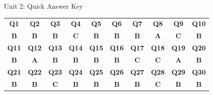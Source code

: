 \begin{answerkeytable}{Unit 2: Quick Answer Key}
\begin{tabular}{c c c c c c c c c c}
\toprule
\textbf{Q1} & \textbf{Q2} & \textbf{Q3} & \textbf{Q4} & \textbf{Q5} & \textbf{Q6} & \textbf{Q7} & \textbf{Q8} & \textbf{Q9} & \textbf{Q10} \\
\textbf{B} & \textbf{B} & \textbf{B} & \textbf{C} & \textbf{B} & \textbf{B} & \textbf{B} & \textbf{A} & \textbf{C} & \textbf{B} \\
\midrule
\textbf{Q11} & \textbf{Q12} & \textbf{Q13} & \textbf{Q14} & \textbf{Q15} & \textbf{Q16} & \textbf{Q17} & \textbf{Q18} & \textbf{Q19} & \textbf{Q20} \\
\textbf{B} & \textbf{A} & \textbf{B} & \textbf{B} & \textbf{B} & \textbf{B} & \textbf{C} & \textbf{C} & \textbf{A} & \textbf{B} \\
\midrule
\textbf{Q21} & \textbf{Q22} & \textbf{Q23} & \textbf{Q24} & \textbf{Q25} & \textbf{Q26} & \textbf{Q27} & \textbf{Q28} & \textbf{Q29} & \textbf{Q30} \\
\textbf{B} & \textbf{B} & \textbf{C} & \textbf{B} & \textbf{B} & \textbf{B} & \textbf{B} & \textbf{C} & \textbf{B} & \textbf{B} \\
\bottomrule
\end{tabular}
\end{answerkeytable}

